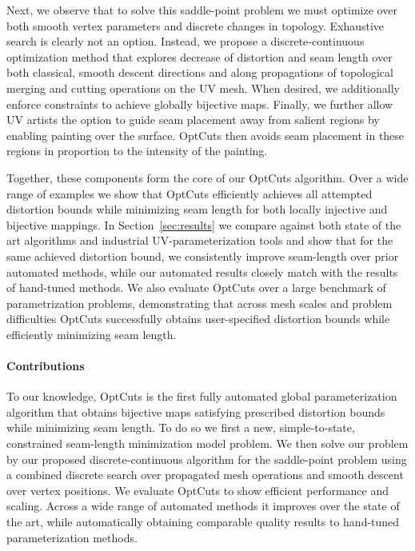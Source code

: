   Next, we observe that to solve this saddle-point problem we must optimize over both smooth vertex parameters and discrete changes in topology. Exhaustive search is clearly not an option. Instead, we propose a discrete-continuous optimization method that explores decrease of distortion and seam length over both classical, smooth descent directions and along propagations of topological merging and cutting operations on the UV mesh. When desired, we additionally enforce constraints to achieve globally bijective maps. Finally, we further allow UV artists the option to guide seam placement away from salient regions by enabling painting over the surface. OptCuts then avoids seam placement in these regions in proportion to the intensity of the painting.
  
  Together, these components form the core of our OptCuts algorithm. Over a wide range of examples we show that OptCuts efficiently achieves all attempted distortion bounds while minimizing seam length for both locally injective and bijective mappings. In Section~\ref{sec:results} we compare against both state of the art algorithms and industrial UV-parameterization tools and show that for the same achieved distortion bound, we consistently improve seam-length over prior automated methods, while our automated results closely match with the results of hand-tuned methods. We also evaluate OptCuts over a large benchmark of parametrization problems, demonstrating that across mesh scales and problem difficulties OptCuts successfully obtains user-specified distortion bounds while efficiently minimizing seam length. 
  
\paragraph{Contributions}

To our knowledge, OptCuts is the first fully automated global parameterization algorithm that obtains bijective maps satisfying prescribed distortion bounds while minimizing seam length. To do so we first   a new, simple-to-state, constrained seam-length minimization model problem. We then solve our problem by our proposed discrete-continuous algorithm for the saddle-point problem using a combined discrete search over propagated mesh operations and smooth descent over vertex positions. We evaluate OptCuts to show efficient performance and scaling. Across a wide range of automated methods it improves over the state of the art, while automatically obtaining comparable quality results to hand-tuned parameterization methods. 
